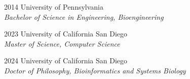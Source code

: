\documentclass[11pt]{formatting-template}
\begin{document}
\begin{vita}
\noindent
\begin{cv}{}
\begin{cvlist}{}
	\item[2014] University of Pennsylvania\\
		\textit{Bachelor of Science in Engineering, Bioengineering}
	\item[2023] University of California San Diego\\
		\textit{Master of Science, Computer Science}
	\item[2024] University of California San Diego\\
		\textit{Doctor of Philosophy, Bioinformatics and Systems Biology}
\end{cvlist}
\end{cv}



\end{vita}

\begin{dissertationabstract}
\end{dissertationabstract}

\mainmatter{}







\appendix





\backmatter{}
% 
%
\end{document}
